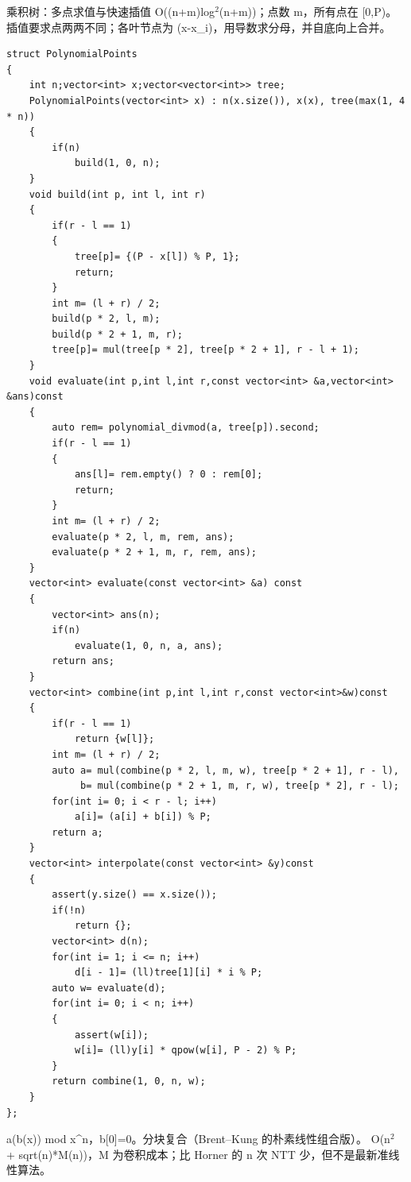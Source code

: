 \documentclass[UTF8,fontset=fandol,a4paper,twoside]{ctexart}
\newcommand{\note}[1]{{\fontsize{10}{12}\selectfont #1\par}}
\begin{document}
\begin{multicols}{2}
\note{乘积树：多点求值与快速插值 O(\allowbreak{}(\allowbreak{}n+\allowbreak{}m)\allowbreak{}log\ensuremath{^2}(\allowbreak{}n+\allowbreak{}m)\allowbreak{})\allowbreak{}；点数 m，所有点在 [\allowbreak{}0,\allowbreak{}P)\allowbreak{}。 插值要求点两两不同；各叶节点为 (\allowbreak{}x-\allowbreak{}x\_i)\allowbreak{}，用导数求分母，并自底向上合并。}
\begin{lstlisting}
struct PolynomialPoints
{
    int n;vector<int> x;vector<vector<int>> tree;
    PolynomialPoints(vector<int> x) : n(x.size()), x(x), tree(max(1, 4 * n))
    {
        if(n)
            build(1, 0, n);
    }
    void build(int p, int l, int r)
    {
        if(r - l == 1)
        {
            tree[p]= {(P - x[l]) % P, 1};
            return;
        }
        int m= (l + r) / 2;
        build(p * 2, l, m);
        build(p * 2 + 1, m, r);
        tree[p]= mul(tree[p * 2], tree[p * 2 + 1], r - l + 1);
    }
    void evaluate(int p,int l,int r,const vector<int> &a,vector<int> &ans)const
    {
        auto rem= polynomial_divmod(a, tree[p]).second;
        if(r - l == 1)
        {
            ans[l]= rem.empty() ? 0 : rem[0];
            return;
        }
        int m= (l + r) / 2;
        evaluate(p * 2, l, m, rem, ans);
        evaluate(p * 2 + 1, m, r, rem, ans);
    }
    vector<int> evaluate(const vector<int> &a) const
    {
        vector<int> ans(n);
        if(n)
            evaluate(1, 0, n, a, ans);
        return ans;
    }
    vector<int> combine(int p,int l,int r,const vector<int>&w)const
    {
        if(r - l == 1)
            return {w[l]};
        int m= (l + r) / 2;
        auto a= mul(combine(p * 2, l, m, w), tree[p * 2 + 1], r - l),
             b= mul(combine(p * 2 + 1, m, r, w), tree[p * 2], r - l);
        for(int i= 0; i < r - l; i++)
            a[i]= (a[i] + b[i]) % P;
        return a;
    }
    vector<int> interpolate(const vector<int> &y)const
    {
        assert(y.size() == x.size());
        if(!n)
            return {};
        vector<int> d(n);
        for(int i= 1; i <= n; i++)
            d[i - 1]= (ll)tree[1][i] * i % P;
        auto w= evaluate(d);
        for(int i= 0; i < n; i++)
        {
            assert(w[i]);
            w[i]= (ll)y[i] * qpow(w[i], P - 2) % P;
        }
        return combine(1, 0, n, w);
    }
};
\end{lstlisting}
\note{a(\allowbreak{}b(\allowbreak{}x)\allowbreak{})\allowbreak{} mod x\textasciicircum{}n，b[\allowbreak{}0]\allowbreak{}=\allowbreak{}0。分块复合（Brent–Kung 的朴素线性组合版）。 O(\allowbreak{}n\ensuremath{^2} +\allowbreak{} sqrt(\allowbreak{}n)\allowbreak{}*M(\allowbreak{}n)\allowbreak{})\allowbreak{}，M 为卷积成本；比 Horner 的 n 次 NTT 少，但不是最新准线性算法。}

\end{multicols}
\end{document}
